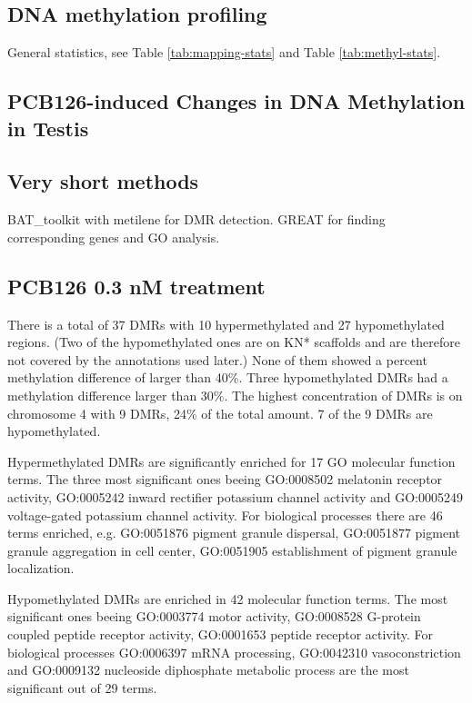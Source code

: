\documentclass{article}
\begin{document}
\subsection{DNA methylation profiling}
General statistics, see Table \ref{tab:mapping-stats} and Table \ref{tab:methyl-stats}.


\subsection{PCB126-induced Changes in DNA Methylation in Testis}

\subsection{Very short methods}
BAT\_toolkit with metilene for DMR detection. GREAT for finding
corresponding genes and GO analysis.

\subsection{PCB126 0.3 nM treatment}
There is a total of 37 DMRs with 10 hypermethylated and 27
hypomethylated regions. (Two of the hypomethylated ones are on KN*
scaffolds and are therefore not covered by the annotations used later.)
None of them showed a percent methylation difference of larger than
40\%. Three hypomethylated DMRs had a methylation difference larger
than 30\%. The highest concentration of DMRs is on chromosome 4 with 9
DMRs, 24\% of the total amount. 7 of the 9 DMRs are hypomethylated.

Hypermethylated DMRs are significantly enriched for 17 GO molecular
function terms. The three most significant ones beeing GO:0008502
melatonin receptor activity, GO:0005242 inward rectifier potassium
channel activity and GO:0005249 voltage-gated potassium channel
activity. For biological processes there are 46 terms enriched,
e.g. GO:0051876 pigment granule dispersal, GO:0051877 pigment granule
aggregation in cell center, GO:0051905 establishment of pigment
granule localization.

Hypomethylated DMRs are enriched in 42 molecular function terms. The
most significant ones beeing GO:0003774 motor activity, GO:0008528
G-protein coupled peptide receptor activity, GO:0001653 peptide
receptor activity. For biological processes GO:0006397 mRNA
processing, GO:0042310 vasoconstriction and GO:0009132 nucleoside
diphosphate metabolic process are the most significant out of 29
terms.
\end{document}
